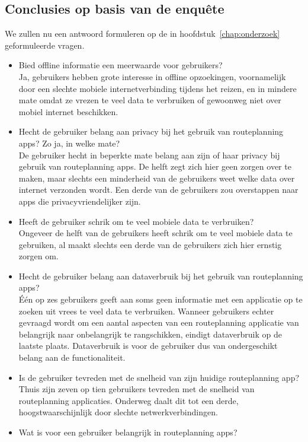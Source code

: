 \subsection{Conclusies op basis van de enquête}
We zullen nu een antwoord formuleren op de in hoofdstuk~\ref{chap:onderzoek} geformuleerde vragen.
\begin{itemize}
	\item Bied offline informatie een meerwaarde voor gebruikers?\\
	Ja, gebruikers hebben grote interesse in offline opzoekingen, voornamelijk door een slechte mobiele internetverbinding tijdens het reizen, en in mindere mate omdat ze vrezen te veel data te verbruiken of gewoonweg niet over mobiel internet beschikken.
	\item Hecht de gebruiker belang aan privacy bij het gebruik van routeplanning apps? Zo ja, in welke mate?\\
	De gebruiker hecht in beperkte mate belang aan zijn of haar privacy bij gebruik van routeplanning apps. De helft zegt zich hier geen zorgen over te maken, maar slechts een minderheid van de gebruikers weet welke data over internet verzonden wordt. Een derde van de gebruikers zou overstappen naar apps die privacyvriendelijker zijn.
	\item Heeft de gebruiker schrik om te veel mobiele data te verbruiken?\\
	Ongeveer de helft van de gebruikers heeft schrik om te veel mobiele data te gebruiken, al maakt slechts een derde van de gebruikers zich hier ernstig zorgen om.
	\item Hecht de gebruiker belang aan dataverbruik bij het gebruik van routeplanning apps?\\
	Één op zes gebruikers geeft aan soms geen informatie met een applicatie op te zoeken uit vrees te veel data te verbruiken. Wanneer gebruikers echter gevraagd wordt om een aantal aspecten van een routeplanning applicatie van belangrijk naar onbelangrijk te rangschikken, eindigt dataverbruik op de laatste plaats. Dataverbruik is voor de gebruiker dus van ondergeschikt belang aan de functionaliteit.
	\item Is de gebruiker tevreden met de snelheid van zijn huidige routeplanning app?\\
	Thuis zijn zeven op tien gebruikers tevreden met de snelheid van routeplanning applicaties. Onderweg daalt dit tot een derde, hoogstwaarschijnlijk door slechte netwerkverbindingen.
	\item Wat is voor een gebruiker belangrijk in routeplanning apps?\\

\end{itemize}
